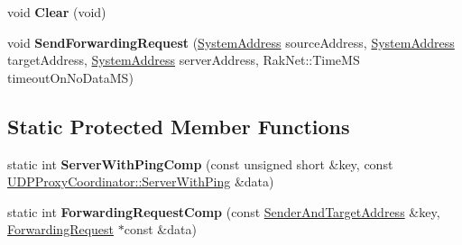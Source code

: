 \begin{DoxyCompactItemize}
\item 
\hypertarget{class_rak_net_1_1_u_d_p_proxy_coordinator_a629700a9cef39b4152e1132d9a357982}{void {\bfseries Clear} (void)}\label{class_rak_net_1_1_u_d_p_proxy_coordinator_a629700a9cef39b4152e1132d9a357982}

\item 
\hypertarget{class_rak_net_1_1_u_d_p_proxy_coordinator_ae80cef72eb730921a9948d078ae2ada2}{void {\bfseries Send\-Forwarding\-Request} (\hyperlink{struct_rak_net_1_1_system_address}{System\-Address} source\-Address, \hyperlink{struct_rak_net_1_1_system_address}{System\-Address} target\-Address, \hyperlink{struct_rak_net_1_1_system_address}{System\-Address} server\-Address, Rak\-Net\-::\-Time\-M\-S timeout\-On\-No\-Data\-M\-S)}\label{class_rak_net_1_1_u_d_p_proxy_coordinator_ae80cef72eb730921a9948d078ae2ada2}

\end{DoxyCompactItemize}
\subsection*{Static Protected Member Functions}
\begin{DoxyCompactItemize}
\item 
\hypertarget{class_rak_net_1_1_u_d_p_proxy_coordinator_a8e2532cd2659fc6fef5c602e1a9bf796}{static int {\bfseries Server\-With\-Ping\-Comp} (const unsigned short \&key, const \hyperlink{struct_rak_net_1_1_u_d_p_proxy_coordinator_1_1_server_with_ping}{U\-D\-P\-Proxy\-Coordinator\-::\-Server\-With\-Ping} \&data)}\label{class_rak_net_1_1_u_d_p_proxy_coordinator_a8e2532cd2659fc6fef5c602e1a9bf796}

\item 
\hypertarget{class_rak_net_1_1_u_d_p_proxy_coordinator_a91e6881f60fc14ee5e4aca7e5f5dda45}{static int {\bfseries Forwarding\-Request\-Comp} (const \hyperlink{struct_rak_net_1_1_u_d_p_proxy_coordinator_1_1_sender_and_target_address}{Sender\-And\-Target\-Address} \&key, \hyperlink{struct_rak_net_1_1_u_d_p_proxy_coordinator_1_1_forwarding_request}{Forwarding\-Request} $\ast$const \&data)}\label{class_rak_net_1_1_u_d_p_proxy_coordinator_a91e6881f60fc14ee5e4aca7e5f5dda45}

\end{DoxyCompactItemize}

